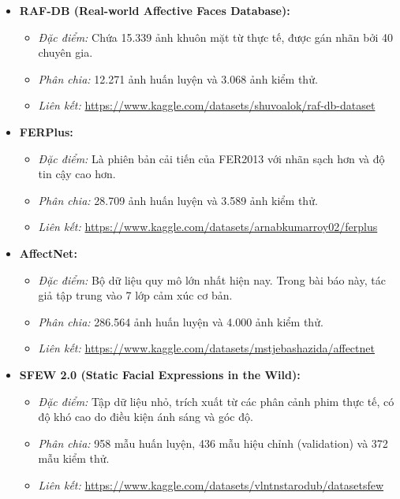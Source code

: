 \begin{itemize}
    \item \textbf{RAF-DB (Real-world Affective Faces Database):}
    \begin{itemize}
        \item \textit{Đặc điểm:} Chứa 15.339 ảnh khuôn mặt từ thực tế, được gán nhãn bởi 40 chuyên gia.
        \item \textit{Phân chia:} 12.271 ảnh huấn luyện và 3.068 ảnh kiểm thử.
        \item \textit{Liên kết:} \url{https://www.kaggle.com/datasets/shuvoalok/raf-db-dataset}
    \end{itemize}

    \item \textbf{FERPlus:}
    \begin{itemize}
        \item \textit{Đặc điểm:} Là phiên bản cải tiến của FER2013 với nhãn sạch hơn và độ tin cậy cao hơn.
        \item \textit{Phân chia:} 28.709 ảnh huấn luyện và 3.589 ảnh kiểm thử.
        \item \textit{Liên kết:} \url{https://www.kaggle.com/datasets/arnabkumarroy02/ferplus}
    \end{itemize}

    \item \textbf{AffectNet:}
    \begin{itemize}
        \item \textit{Đặc điểm:} Bộ dữ liệu quy mô lớn nhất hiện nay. Trong bài báo này, tác giả tập trung vào 7 lớp cảm xúc cơ bản.
        \item \textit{Phân chia:} 286.564 ảnh huấn luyện và 4.000 ảnh kiểm thử.
        \item \textit{Liên kết:} \url{https://www.kaggle.com/datasets/mstjebashazida/affectnet}
    \end{itemize}

    \item \textbf{SFEW 2.0 (Static Facial Expressions in the Wild):}
    \begin{itemize}
        \item \textit{Đặc điểm:} Tập dữ liệu nhỏ, trích xuất từ các phân cảnh phim thực tế, có độ khó cao do điều kiện ánh sáng và góc độ.
        \item \textit{Phân chia:} 958 mẫu huấn luyện, 436 mẫu hiệu chỉnh (validation) và 372 mẫu kiểm thử.
        \item \textit{Liên kết:} \url{https://www.kaggle.com/datasets/vlntnstarodub/datasetsfew}
    \end{itemize}


\end{itemize}
